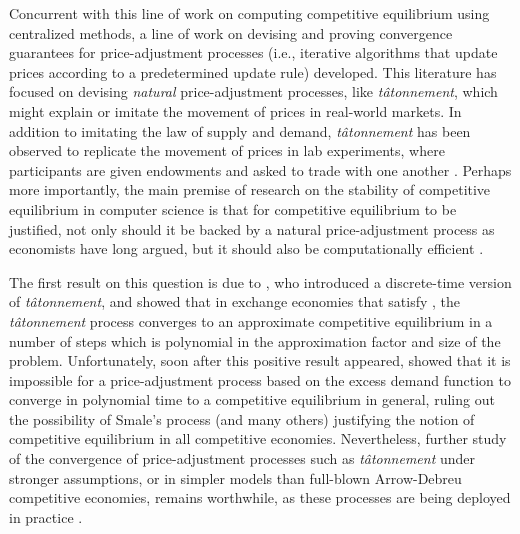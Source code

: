 Concurrent with this line of work on computing competitive equilibrium using centralized methods, a line of work on devising and proving 
convergence guarantees for price-adjustment processes (i.e., iterative algorithms that update prices according to a predetermined update rule) developed.
This literature has focused on devising \emph{natural\/} price-adjustment processes, like \emph{t\^atonnement}, which might explain or imitate the movement of prices in real-world markets.
In addition to imitating the law of supply and demand, \emph{t\^atonnement} has been observed to replicate the movement of prices in lab experiments, where participants are given endowments and asked to trade with one another \cite{gillen2020divergence}.
Perhaps more importantly, the main premise of research on the stability of competitive equilibrium in computer science 
is that for competitive equilibrium to be justified, not only should it be backed by a natural price-adjustment process as economists have long argued, but it should also be computationally efficient \cite{AGT-book}.

The first result on this question is due to \citet{codenotti2005market}, who introduced a discrete-time version of \emph{t\^atonnement}, 
and showed that in exchange economies that satisfy , the \emph{t\^atonnement\/} process converges to an approximate competitive equilibrium in a number of steps which is polynomial in the approximation factor and size of the problem.
Unfortunately, soon after this positive result appeared, \citet{papadimitriou2010impossibility} showed that it is impossible for a price-adjustment process based on the excess demand function to converge in polynomial time to a competitive equilibrium in general, ruling out the possibility of Smale's process (and many others)
justifying the notion of competitive equilibrium in all competitive economies.
Nevertheless, further study of the convergence of price-adjustment processes such as \emph{t\^atonnement\/} under stronger assumptions, or in simpler models than full-blown Arrow-Debreu competitive economies, remains worthwhile, as these processes are being deployed in practice \cite{jain2013constrained, leonardos2021dynamical, liu2022empirical, reijsbergen2021transaction}.


